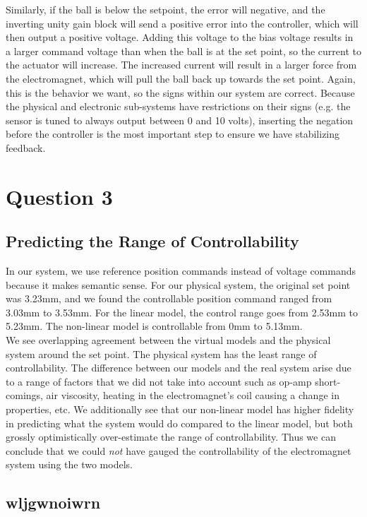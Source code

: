 \documentclass{article}
\theoremstyle{plain}
\theoremstyle{definition}
\theoremstyle{remark}
\begin{document}
Similarly, if the ball is below the setpoint, the error will negative, and the inverting unity gain block will send a positive error into the controller, which will then output a positive voltage. Adding this voltage to the bias voltage results in a larger command voltage than when the ball is at the set point, so the current to the actuator will increase. The increased current will result in a larger force from the electromagnet, which will pull the ball back up towards the set point. Again, this is the behavior we want, so the signs within our system are correct. Because the physical and electronic sub-systems have restrictions on their signs (e.g. the sensor is tuned to always output between 0 and 10 volts), inserting the negation before the controller is the most important step to ensure we have stabilizing feedback. 

\section*{Question 3}
\subsection*{Predicting the Range of Controllability}

In our system, we use reference position commands instead of voltage commands because it makes semantic sense. For our physical system, the original set point was 3.23mm, and we found the controllable position command ranged from 3.03mm to 3.53mm. For the linear model, the control range goes from 2.53mm to 5.23mm. The non-linear model is controllable from 0mm to 5.13mm.\\

We see overlapping agreement between the virtual models and the physical system around the set point. The physical system has the least range of controllability. The difference between our models and the real system arise due to a range of factors that we did not take into account such as op-amp short-comings, air viscosity, heating in the electromagnet's coil causing a change in properties, etc. We additionally see that our non-linear model has higher fidelity in predicting what the system would do compared to the linear model, but both grossly optimistically over-estimate the range of controllability. Thus we can conclude that we could \emph{not} have gauged the controllability of the electromagnet system using the two models.\\

\subsection*{wljgwnoiwrn}
\end{document}

